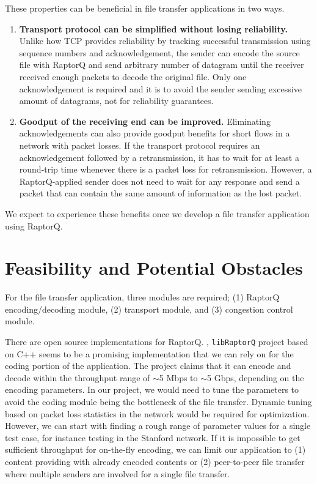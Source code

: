 \documentclass{sig-alternate-10pt}
\begin{document}
These properties can be beneficial in file transfer applications in two ways.
\begin{enumerate}[label=(\alph*)]
  \item \textbf{Transport protocol can be simplified without losing
  reliability.}
  Unlike how TCP provides reliability by tracking successful transmission using
  sequence numbers and acknowledgement, the sender can encode the source file
  with RaptorQ and send arbitrary number of datagram until the receiver received
  enough packets to decode the original file. Only one acknowledgement is
  required and it is to avoid the sender sending excessive amount of datagrams,
  not for reliability guarantees.
  \item \textbf{Goodput of the receiving end can be improved.}
  Eliminating acknowledgements can also provide goodput benefits for short flows
  in a network with packet losses. If the transport protocol requires an
  acknowledgement followed by a retransmission, it has to wait for at least a
  round-trip time whenever there is a packet loss for retransmission. However,
  a RaptorQ-applied sender does not need to wait for any response and send a
  packet that can contain the same amount of information as the lost packet.
\end{enumerate}

We expect to experience these benefits once we develop a file transfer
application using RaptorQ.

\section{Feasibility and Potential Obstacles}
For the file transfer application, three modules are required; (1) RaptorQ
encoding/decoding module, (2) transport module, and (3) congestion control
module. 

There are open source implementations for RaptorQ. \cite{openrq},
\cite{libraptorq} \texttt{libRaptorQ} project \cite{libraptorq} based on C++
seems to be a promising implementation that we can rely on for the coding
portion of the application. The project claims that it can encode and decode
within the throughput range of $\sim$5 Mbps to $\sim$5 Gbps, depending on the encoding
parameters. In our project, we would need to tune the parameters to avoid the
coding module being the bottleneck of the file transfer.  Dynamic tuning based
on packet loss statistics in the network would be required for optimization.
However, we can start with finding a rough range of parameter values for a
single test case, for instance testing in the Stanford network. If it is
impossible to get sufficient throughput for on-the-fly encoding, we can limit
our application to (1) content providing with already encoded contents or (2)
peer-to-peer file transfer where multiple senders are involved for a single file
transfer.
\end{document}
